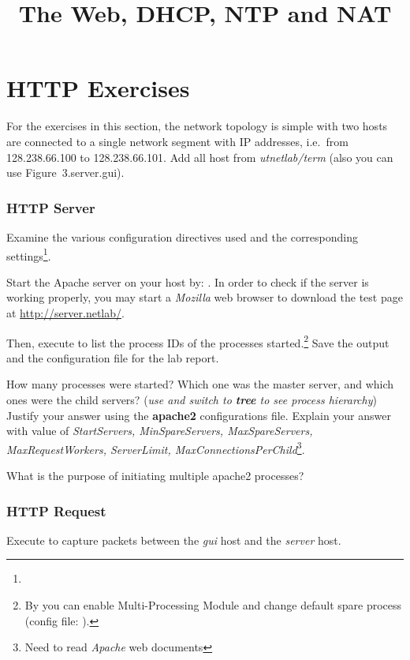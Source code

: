 \documentclass{../UTNetLab}
\title{The Web, DHCP, NTP and NAT}
\begin{document}
\part{HTTP Exercises}
    For the exercises in this section, the network topology is simple with two hosts are connected to a single network segment with IP addresses, i.e.\  from 128.238.66.100 to 128.238.66.101.
    Add all host from \textit{utnetlab/term} (also you can use {Figure~3.server.gui}).

\section{HTTP Server}
    Examine the various configuration directives used and the corresponding settings\footnote{}.

    Start the Apache server on your host by: .
    In order to check if the server is working properly, you may start a \textit{Mozilla} web browser to download the test page at \url{http://server.netlab/}.

    Then, execute  to list the process IDs of the  processes started.\footnote{By  you can enable Multi-Processing Module and change default spare process (config file: ).}
    Save the output and the configuration file for the lab report.

    \begin{report}
        \item How many  processes were started?
            Which one was the master server, and which ones were the child servers? (\textit{use  and switch to \textbf{tree} to see process hierarchy})
            Justify your answer using the \textbf{apache2} configurations file.
            Explain your answer with value of \textit{StartServers, MinSpareServers, MaxSpareServers, MaxRequestWorkers, ServerLimit, MaxConnectionsPerChild}\footnote{Need to read \textit{Apache} web documents}.

        \item What is the purpose of initiating multiple apache2 processes?
    \end{report}

\section{HTTP Request}
    Execute  to capture packets between the \textit{gui} host and the \textit{server} host.
\end{document}
